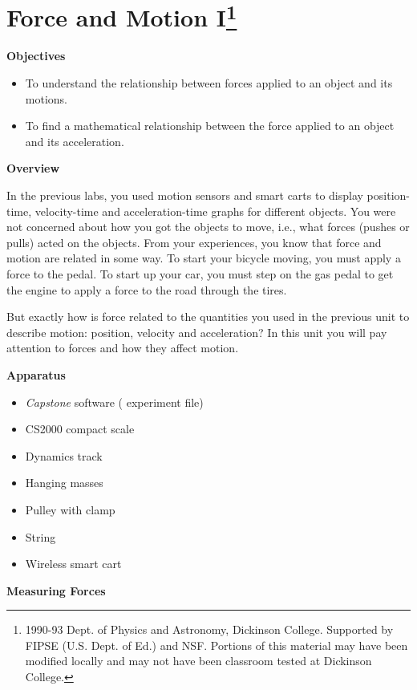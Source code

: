
\section{Force and Motion I\footnote{
1990-93 Dept. of Physics and Astronomy, Dickinson College. Supported by FIPSE
(U.S. Dept. of Ed.) and NSF. Portions of this material may have been modified
locally and may not have been classroom tested at Dickinson College.
}}

\makelabheader %

\medskip
\textbf{Objectives }

\begin{itemize}[nosep]
\item To understand the relationship between forces applied to an object and its motions. 
\item To find a mathematical relationship between the force applied to an object and its acceleration.
\end{itemize}
\textbf{Overview }

In the previous labs, you used motion sensors and smart carts to display position-time,
velocity-time and acceleration-time graphs for different objects. You were not concerned about how you got the objects to move, i.e., what forces (pushes or pulls) acted on the objects. From your experiences, you know that force and motion are related in some way. To start your bicycle moving, you must apply a force to the pedal. To start up your car, you must step on the
gas pedal to get the engine to apply a force to the road through the tires.

But exactly how is force related to the quantities you used in the previous
unit to describe motion: position, velocity and acceleration? In this unit you
will pay attention to forces and how they affect motion. 

\medskip
\textbf{Apparatus} 

\begin{itemize} [nosep]
\item \textit{Capstone} software ( experiment file)
\item CS2000 compact scale
\item Dynamics track
\item Hanging masses
\item Pulley with clamp
\item String
\item Wireless smart cart
\end{itemize}
\textbf{Measuring Forces} 


